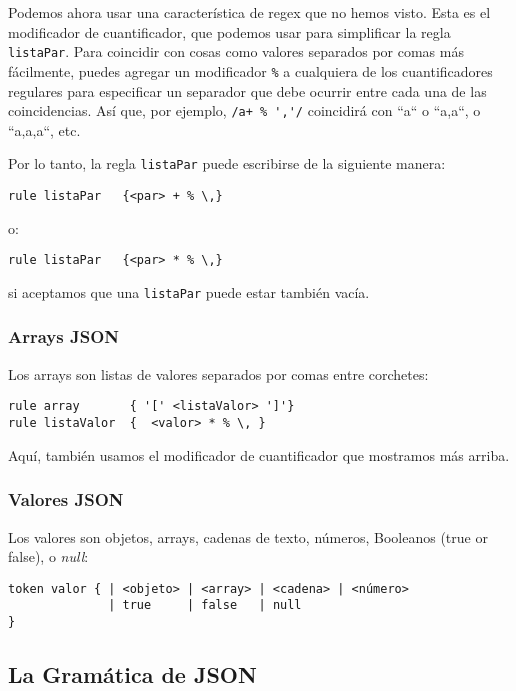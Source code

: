 Podemos ahora usar una característica de regex que no hemos
visto. Esta es el modificador de cuantificador, que podemos
usar para simplificar la regla {\tt listaPar}. Para coincidir
con cosas como valores separados por comas más fácilmente, 
puedes agregar un modificador \verb|%| a cualquiera de los
cuantificadores regulares para especificar un separador
que debe ocurrir entre cada una de las coincidencias. Así 
que, por ejemplo, \verb|/a+ % ','/| coincidirá con ``a`` o ``a,a``,
o ``a,a,a``, etc.


Por lo tanto, la regla {\tt listaPar} puede escribirse de la 
siguiente manera:

\begin{verbatim}
rule listaPar   {<par> + % \,}
\end{verbatim}

o:

\begin{verbatim}
rule listaPar   {<par> * % \,}
\end{verbatim}

si aceptamos que una {\tt listaPar} puede estar también vacía.

\subsubsection{Arrays JSON}

Los arrays son listas de valores separados por comas entre corchetes:

\begin{verbatim}
rule array       { '[' <listaValor> ']'}
rule listaValor  {  <valor> * % \, }
\end{verbatim}

Aquí, también usamos el modificador de cuantificador 
que mostramos más arriba.

\subsubsection{Valores JSON}

Los valores son objetos, arrays, cadenas de texto, números,
Booleanos (true or false), o \emph{null}:

\begin{verbatim}
token valor { | <objeto> | <array> | <cadena> | <número> 
              | true     | false   | null 
}
\end{verbatim}

\subsection{La Gramática de JSON}

